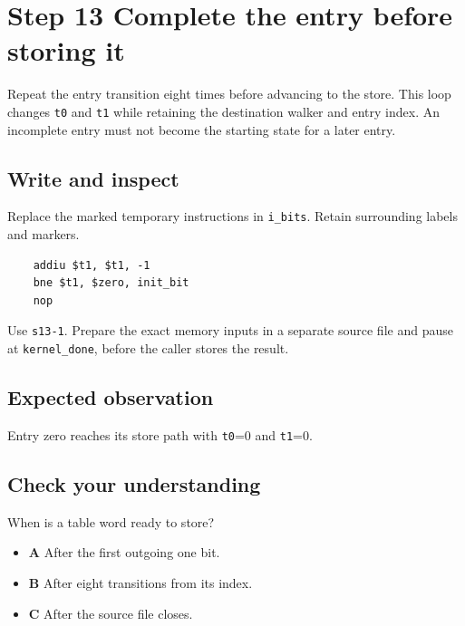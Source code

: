 \section{Step 13 Complete the entry before storing it}\label{crc-s13}

Repeat the entry transition eight times before advancing to the store. This loop changes \texttt{t0} and \texttt{t1} while retaining the destination walker and entry index. An incomplete entry must not become the starting state for a later entry.

\subsection{Write and inspect}
Replace the marked temporary instructions in \texttt{i\_bits}. Retain surrounding labels and markers.

\begin{verbatim}
    addiu $t1, $t1, -1
    bne $t1, $zero, init_bit
    nop
\end{verbatim}

Use \texttt{s13-1}. Prepare the exact memory inputs in a separate source file and pause at \texttt{kernel\_done}, before the caller stores the result.

\subsection{Expected observation}
Entry zero reaches its store path with \texttt{t0}=0 and \texttt{t1}=0.

\subsection{Check your understanding}
When is a table word ready to store?

\begin{itemize}
  \item \textbf{A} After the first outgoing one bit.
  \item \textbf{B} After eight transitions from its index.
  \item \textbf{C} After the source file closes.
\end{itemize}
